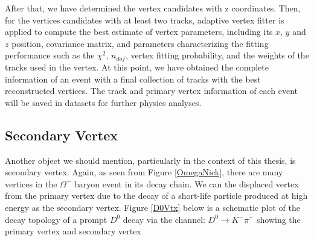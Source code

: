 After that, we have determined the vertex candidates with z coordinates. Then,  for the vertices candidates with at least two tracks, adaptive vertex fitter \cite{AVT} is applied to compute the best estimate of vertex parameters, including its $x$, $y$ and $z$ position, covariance matrix, and parameters characterizing the fitting performance such as the $\chi^2$, $n_{dof}$, vertex fitting probability, and the weights of the tracks used in the vertex. At this point, we have obtained the complete information of an event with a final collection of tracks with the best reconstructed vertices. The track and primary vertex information of each event will be saved in datasets for further physics analyses.

\subsection{Secondary Vertex}

Another object we should mention, particularly in the context of this thesis, is secondary vertex. Again, as seen from Figure \ref{OmegaNick}, there are many vertices in the $\Omega^-$ baryon event in its decay chain. We can the displaced vertex from the primary vertex due to the decay of a short-life particle produced at high energy as the secondary vertex. Figure \ref{D0Vtx} below is a schematic plot of the decay topology of a prompt $D^0$ decay via the channel: $D^0 \rightarrow K^- \pi^+$ showing the primary vertex and secondary vertex  

